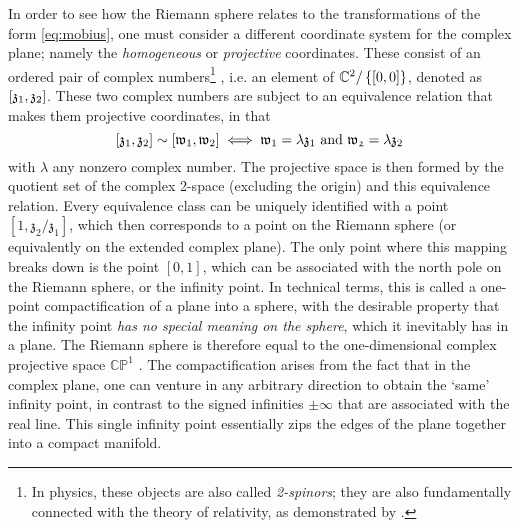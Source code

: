 In order to see how the Riemann sphere relates to the transformations of the form \cref{eq:mobius}, one must consider a different coordinate system for the complex plane; namely the \emph{homogeneous} or \emph{projective} coordinates. These consist of an ordered pair of complex numbers\footnote{In physics, these objects are also called \emph{2-spinors}; they are also fundamentally connected with the theory of relativity, as demonstrated by \cite{Penrose1984}.} , i.e. an element of \(\mathbb{C}^2/\left\{[0, 0]\right\}\),  denoted as \(\qty[\mathfrak{z}_1, \mathfrak{z}_2]\). These two complex numbers are subject to an equivalence relation that makes them projective coordinates, in that \[\qty[\mathfrak{z}_1, \mathfrak{z}_2] \sim \qty[\mathfrak{w}_1, \mathfrak{w}_2] \iff \mathfrak{w}_1 = \lambda \mathfrak{z}_1 \text{ and } \mathfrak{w_2} = \lambda \mathfrak{z}_2\]
with \(\lambda\) any nonzero complex number. The projective space is then formed by the quotient set of the complex 2-space (excluding the origin) and this equivalence relation. Every equivalence class can be uniquely identified with a point \([1, \mathfrak{z}_2/\mathfrak{z}_1]\), which then corresponds to a point on the Riemann sphere (or equivalently on the extended complex plane). The only point where this mapping breaks down is the point \([0, 1]\), which can be associated with the north pole on the Riemann sphere, or the infinity point. In technical terms, this is called a one-point compactification of a plane into a sphere, with the desirable property that the infinity point \emph{has no special meaning on the sphere}, which it inevitably has in a plane. The Riemann sphere is therefore equal to the one-dimensional complex projective space \(\mathbb{CP}^1\) \cite{Thurston1997}. The compactification arises from the fact that in the complex plane, one can venture in any arbitrary direction to obtain the `same' infinity point, in contrast to the signed infinities $\pm \infty$ that are associated with the real line. This single infinity point essentially zips the edges of the plane together into a compact manifold.

